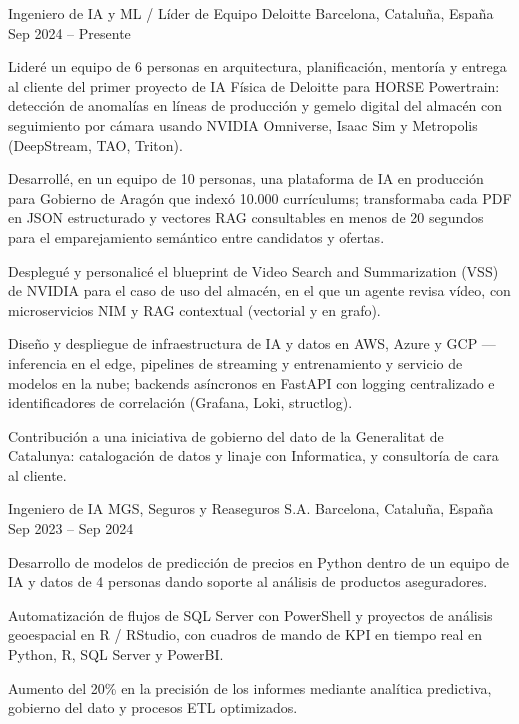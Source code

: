 
\begin{cventries}

\cventry
  {Ingeniero de IA y ML / Líder de Equipo}
  {Deloitte}
  {Barcelona, Cataluña, España}
  {Sep 2024 -- Presente}
  {
   \begin{cvitems}
    \item {Lideré un equipo de 6 personas en arquitectura, planificación, mentoría y entrega al cliente del primer proyecto de IA Física de Deloitte para HORSE Powertrain: detección de anomalías en líneas de producción y gemelo digital del almacén con seguimiento por cámara usando NVIDIA Omniverse, Isaac Sim y Metropolis (DeepStream, TAO, Triton).}
    \item {Desarrollé, en un equipo de 10 personas, una plataforma de IA en producción para Gobierno de Aragón que indexó 10.000 currículums; transformaba cada PDF en JSON estructurado y vectores RAG consultables en menos de 20 segundos para el emparejamiento semántico entre candidatos y ofertas.}
    \item {Desplegué y personalicé el blueprint de Video Search and Summarization (VSS) de NVIDIA para el caso de uso del almacén, en el que un agente revisa vídeo, con microservicios NIM y RAG contextual (vectorial y en grafo).}
    \item {Diseño y despliegue de infraestructura de IA y datos en AWS, Azure y GCP --- inferencia en el edge, pipelines de streaming y entrenamiento y servicio de modelos en la nube; backends asíncronos en FastAPI con logging centralizado e identificadores de correlación (Grafana, Loki, structlog).}
    \item {Contribución a una iniciativa de gobierno del dato de la Generalitat de Catalunya: catalogación de datos y linaje con Informatica, y consultoría de cara al cliente.}
   \end{cvitems}
  }

\vspace{3mm}
\cventry
  {Ingeniero de IA}
  {MGS, Seguros y Reaseguros S.A.}
  {Barcelona, Cataluña, España}
  {Sep 2023 -- Sep 2024}
  {
   \begin{cvitems}
    \item {Desarrollo de modelos de predicción de precios en Python dentro de un equipo de IA y datos de 4 personas dando soporte al análisis de productos aseguradores.}
    \item {Automatización de flujos de SQL Server con PowerShell y proyectos de análisis geoespacial en R / RStudio, con cuadros de mando de KPI en tiempo real en Python, R, SQL Server y PowerBI.}
    \item {Aumento del 20\% en la precisión de los informes mediante analítica predictiva, gobierno del dato y procesos ETL optimizados.}
   \end{cvitems}
  }


\end{cventries}

